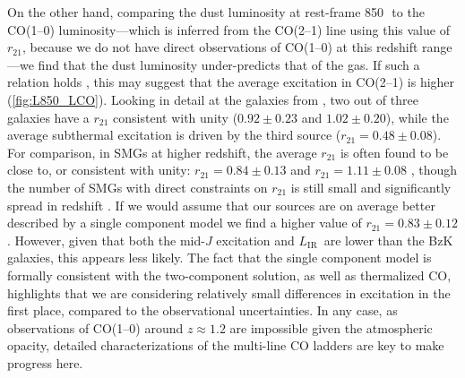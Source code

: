\documentclass[twocolumn]{aastex62}
\newcommand{\LIR}{\ensuremath{L_{\mathrm{IR}}}}
\newcommand{\rTwoOneLVGzLoOne}{\ensuremath{0.83 \pm 0.12}}
\begin{document}
On the other hand, comparing the dust luminosity at rest-frame 850\,\micron\ to
the CO(1--0) luminosity---which is inferred from the CO(2--1) line using this
value of $r_{21}$, because we do not have direct observations of CO(1--0) at
this redshift range---we find that the dust luminosity under-predicts that of
the gas.  If such a relation holds \citep{Scoville2016}, this may suggest that
the average excitation in CO(2--1) is higher (\autoref{fig:L850_LCO}).  Looking
in detail at the galaxies from \cite{Daddi2015}, two out of three galaxies have
a $r_{21}$ consistent with unity ($0.92 \pm 0.23$ and $1.02 \pm 0.20$), while
the average subthermal excitation is driven by the third source
($r_{21}=0.48 \pm 0.08$).  For comparison, in SMGs at higher redshift, the
average $r_{21}$ is often found to be close to, or consistent with unity:
$r_{21} = 0.84 \pm 0.13$ \citep{Bothwell2013} and $r_{21} = 1.11 \pm 0.08$
\cite[][i.e., suprathermal, though we caution this sample potentially suffers
from line-dependent differences in the lensing amplification]{Spilker2014},
though the number of SMGs with direct constraints on $r_{21}$ is still small
and significantly spread in redshift \citep{Carilli2010, Riechers2013,
  Aravena2016}.  If we would assume that our sources are on average better
described by a single component model we find a higher value of
$r_{21} = \rTwoOneLVGzLoOne$.  However, given that both the mid-$J$ excitation
and \LIR\ are lower than the BzK galaxies, this appears less likely.  The fact
that the single component model is formally consistent with the two-component
solution, as well as thermalized CO, highlights that we are considering
relatively small differences in excitation in the first place, compared to the
observational uncertainties.  In any case, as observations of CO(1--0) around
$z\approx1.2$ are impossible given the atmospheric opacity, detailed
characterizations of the multi-line CO ladders are key to make progress here.
\end{document}
